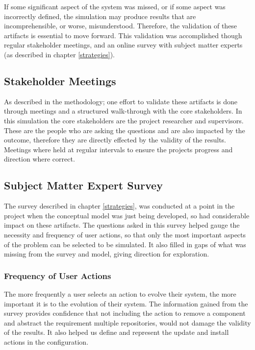 If some significant aspect of the system was missed, or if some aspect was incorrectly defined, the simulation may produce results that are incomprehensible,
or worse, misunderstood.
Therefore, the validation of these artifacts is essential to move forward. 
This validation was accomplished though regular stakeholder meetings, and an online survey with subject matter experts (as described in chapter \ref{strategies}).

\subsection{Stakeholder Meetings}
As described in the methodology; one effort to validate these artifacts is done through meetings and a structured walk-through with the core stakeholders.
In this simulation the core stakeholders are the project researcher and supervisors.
These are the people who are asking the questions and are also impacted by the outcome, therefore they are directly effected by the validity of the results.
Meetings where held at regular intervals to ensure the projects progress and direction where correct.

\subsection{Subject Matter Expert Survey}
The survey described in chapter \ref{strategies}, 
was conducted at a point in the project when the conceptual model was just being developed, so had considerable impact on these artifacts.
The questions asked in this survey helped gauge the necessity and frequency of user actions,
so that only the most important aspects of the problem can be selected to be simulated.
It also filled in gaps of what was missing from the survey and model, giving direction for exploration.

\subsubsection{Frequency of User Actions}
The more frequently a user selects an action to evolve their system, the more important it is to the evolution of their system.
The information gained from the survey provides confidence that not including the action to remove a component and abstract the requirement multiple repositories, 
would not damage the validity of the results.
It also helped us define and represent the update and install actions in the configuration.

